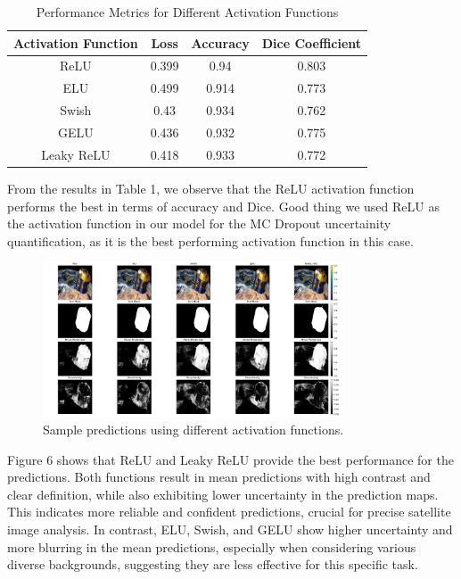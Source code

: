 \documentclass{article}
\begin{document}
\begin{table}[h!]
    \centering
    \begin{tabular}{|c|c|c|c|}
        \hline
        \textbf{Activation Function} & \textbf{Loss} & \textbf{Accuracy} & \textbf{Dice Coefficient} \\
        \hline
        ReLU & 0.399 & 0.94 & 0.803 \\
        \hline
        ELU & 0.499 & 0.914 & 0.773 \\
        \hline
        Swish & 0.43 & 0.934 & 0.762 \\
        \hline
        GELU & 0.436 & 0.932 & 0.775 \\
        \hline
        Leaky ReLU & 0.418 & 0.933 & 0.772 \\
        \hline
    \end{tabular}
    \caption{Performance Metrics for Different Activation Functions}
    \label{tab:activation_functions}
\end{table}

From the results in Table 1, we observe that the ReLU activation function performs the best in terms of accuracy and Dice. 
Good thing we used ReLU as the activation function in our model for the MC Dropout uncertainity quantification, as it is 
the best performing activation function in this case.

\begin{figure}[h]
    \centering
    \includegraphics[width=0.8\textwidth]{../images/activation_funcs/activation_funcs_predictions.png}
    \caption{Sample predictions using different activation functions.}
    \label{fig:activation_functions_predictions}
\end{figure}
\vspace{1em}

Figure 6 shows that ReLU and Leaky ReLU provide the best performance for the predictions. Both functions result in mean 
predictions with high contrast and clear definition, while also exhibiting lower uncertainty in the prediction maps. 
This indicates more reliable and confident predictions, crucial for precise satellite image analysis. In contrast, ELU, 
Swish, and GELU show higher uncertainty and more blurring in the mean predictions, especially when considering various 
diverse backgrounds, suggesting they are less effective for this specific task.
\end{document}
